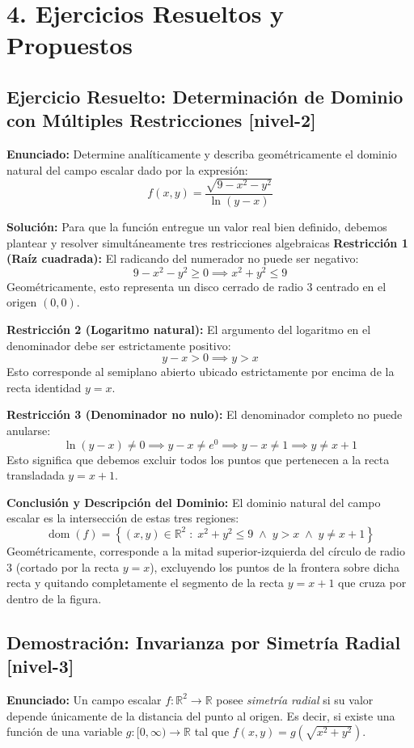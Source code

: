 \documentclass[11pt]{article}
\newenvironment{ejercicios}{%
  \section*{4. Ejercicios Resueltos y Propuestos}%
}{}
\newenvironment{ejercicioresuelto}[2]{\subsection*{Ejercicio Resuelto: #1 \small{[#2]}}}{}
\newenvironment{ejerciciodemostracion}[2]{\subsection*{Demostración: #1 \small{[#2]}}}{}
\newcommand{\enunciado}[1]{\textbf{Enunciado:} #1\par\vspace{0.2cm}}
\newcommand{\solucion}[1]{\textbf{Solución:} #1\par\vspace{0.4cm}}
\begin{document}
\begin{ejercicios}

  \begin{ejercicioresuelto}{Determinación de Dominio con Múltiples Restricciones}{nivel-2}
    \enunciado{
      Determine analíticamente y describa geométricamente el dominio natural del campo escalar dado por la expresión:
      $$f(x,y) = \dfrac{\sqrt{9 - x^2 - y^2}}{\ln(y - x)}$$
    }
    \solucion{
      Para que la función entregue un valor real bien definido, debemos plantear y resolver simultáneamente tres restricciones algebraicas \colon \textbf{Restricción 1 (Raíz cuadrada):} El radicando del numerador no puede ser negativo:
      $$ 9 - x^2 - y^2 \geq 0 \implies x^2 + y^2 \leq 9 $$
      Geométricamente, esto representa un disco cerrado de radio $3$ centrado en el origen $(0,0)$.
      
      \textbf{Restricción 2 (Logaritmo natural):} El argumento del logaritmo en el denominador debe ser estrictamente positivo:
      $$ y - x > 0 \implies y > x $$
      Esto corresponde al semiplano abierto ubicado estrictamente por encima de la recta identidad $y = x$.
      
      \textbf{Restricción 3 (Denominador no nulo):} El denominador completo no puede anularse:
      $$ \ln(y - x) \neq 0 \implies y - x \neq e^0 \implies y - x \neq 1 \implies y \neq x + 1 $$
      Esto significa que debemos excluir todos los puntos que pertenecen a la recta transladada $y = x + 1$.
      
      \textbf{Conclusión y Descripción del Dominio:}
      El dominio natural del campo escalar es la intersección de estas tres regiones:
      $$ \operatorname{dom}(f) = \left\{ (x,y) \in \mathbb{R}^2 \;\colon\; x^2 + y^2 \leq 9 \;\land\; y > x \;\land\; y \neq x + 1 \right\} $$
      Geométricamente, corresponde a la mitad superior-izquierda del círculo de radio 3 (cortado por la recta $y=x$), excluyendo los puntos de la frontera sobre dicha recta y quitando completamente el segmento de la recta $y = x + 1$ que cruza por dentro de la figura.
    }
  \end{ejercicioresuelto}

  \begin{ejerciciodemostracion}{Invarianza por Simetría Radial}{nivel-3}
    \enunciado{
      Un campo escalar $f \colon \mathbb{R}^2 \to \mathbb{R}$ posee \textit{simetría radial} si su valor depende únicamente de la distancia del punto al origen. Es decir, si existe una función de una variable $g \colon [0, \infty) \to \mathbb{R}$ tal que $f(x,y) = g(\sqrt{x^2+y^2})$. 
      
}
\end{ejerciciodemostracion}
\end{ejercicios}
\end{document}
